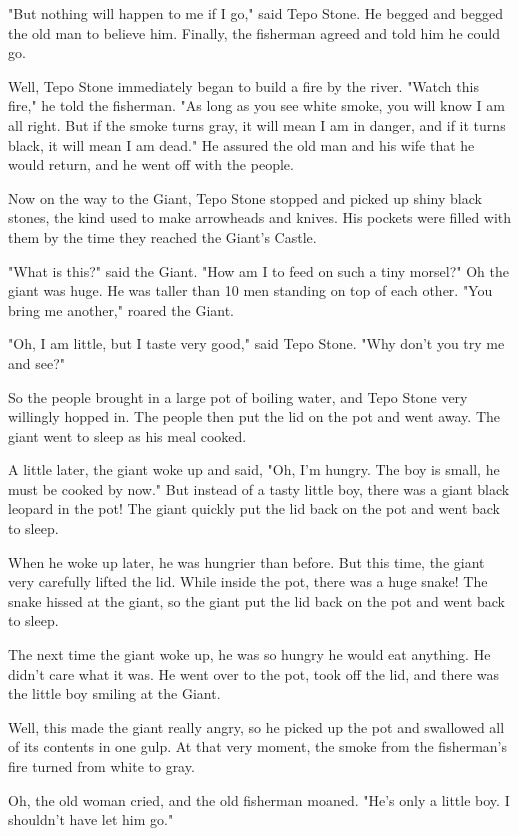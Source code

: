 "But nothing will happen to me if I go," said Tepo Stone. He begged and begged the old man to believe him. Finally, the fisherman agreed and told him he could go.

Well, Tepo Stone immediately began to build a fire by the river. "Watch this fire," he told the fisherman. "As long as you see white smoke, you will know I am all right. But if the smoke turns gray, it will mean I am in danger, and if it turns black, it will mean I am dead." He assured the old man and his wife that he would return, and he went off with the people.

Now on the way to the Giant, Tepo Stone stopped and picked up shiny black stones, the kind used to make arrowheads and knives. His pockets were filled with them by the time they reached the Giant's Castle.

"What is this?" said the Giant. "How am I to feed on such a tiny morsel?" Oh the giant was huge. He was taller than 10 men standing on top of each other. "You bring me another," roared the Giant.

"Oh, I am little, but I taste very good," said Tepo Stone. "Why don't you try me and see?"

So the people brought in a large pot of boiling water, and Tepo Stone very willingly hopped in. The people then put the lid on the pot and went away. The giant went to sleep as his meal cooked.

A little later, the giant woke up and said, "Oh, I'm hungry. The boy is small, he must be cooked by now." But instead of a tasty little boy, there was a giant black leopard in the pot! The giant quickly put the lid back on the pot and went back to sleep.

When he woke up later, he was hungrier than before. But this time, the giant very carefully lifted the lid. While inside the pot, there was a huge snake! The snake hissed at the giant, so the giant put the lid back on the pot and went back to sleep.

The next time the giant woke up, he was so hungry he would eat anything. He didn't care what it was. He went over to the pot, took off the lid, and there was the little boy smiling at the Giant.

Well, this made the giant really angry, so he picked up the pot and swallowed all of its contents in one gulp. At that very moment, the smoke from the fisherman's fire turned from white to gray.

Oh, the old woman cried, and the old fisherman moaned. "He's only a little boy. I shouldn't have let him go."

